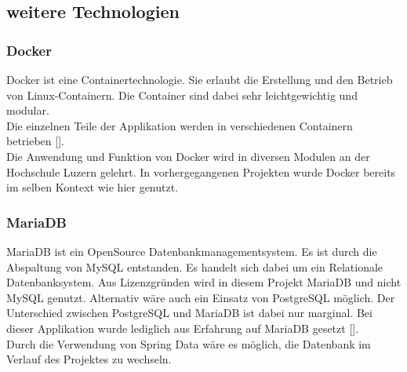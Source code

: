 \subsection{weitere Technologien}
\subsubsection{Docker}
Docker ist eine Containertechnologie. Sie erlaubt die Erstellung und den Betrieb von Linux-Containern. Die Container sind dabei sehr leichtgewichtig und modular.\\
Die einzelnen Teile der Applikation werden in verschiedenen Containern betrieben [\cite{docker}].\\
Die Anwendung und Funktion von Docker wird in diversen Modulen an der Hochschule Luzern gelehrt. In vorhergegangenen Projekten wurde Docker bereits im selben Kontext wie hier genutzt. 

\subsubsection{MariaDB}
MariaDB ist ein OpenSource Datenbankmanagementsystem. Es ist durch die Abspaltung von MySQL entstanden. Es handelt sich dabei um ein Relationale Datenbanksystem. 
Aus Lizenzgründen wird in diesem Projekt MariaDB und nicht MySQL genutzt. Alternativ wäre auch ein Einsatz von PostgreSQL möglich. Der Unterschied zwischen PostgreSQL und MariaDB ist dabei nur marginal. Bei dieser Applikation wurde lediglich aus Erfahrung auf MariaDB gesetzt [\cite{mariadbVsPostgresql}]. \\
Durch die Verwendung von Spring Data wäre es möglich, die Datenbank im Verlauf des Projektes zu wechseln. 
\newpage